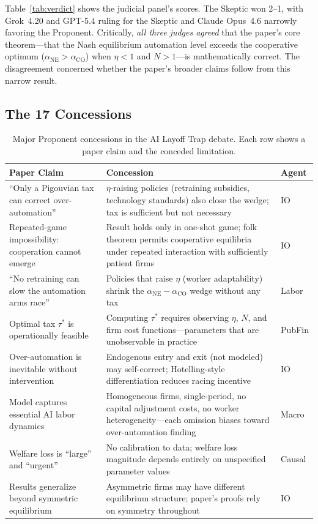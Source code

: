 \documentclass[11pt]{article}
\begin{document}
Table~\ref{tab:verdict} shows the judicial panel's scores.
The Skeptic won 2--1, with Grok~4.20 and GPT-5.4 ruling for the Skeptic and Claude Opus~4.6 narrowly favoring the Proponent.
Critically, \emph{all three judges agreed} that the paper's core theorem---that the Nash equilibrium automation level exceeds the cooperative optimum ($\alpha_{\mathrm{NE}} > \alpha_{\mathrm{CO}}$) when $\eta < 1$ and $N > 1$---is mathematically correct.
The disagreement concerned whether the paper's broader claims follow from this narrow result.


\subsection{The 17 Concessions}

\begin{table}[t]
\centering
\caption{Major Proponent concessions in the AI Layoff Trap debate. Each row shows a paper claim and the conceded limitation.}
\label{tab:concessions}
\small
\begin{tabularx}{\textwidth}{@{}p{3.8cm}Xl@{}}
\toprule
\textbf{Paper Claim} & \textbf{Concession} & \textbf{Agent} \\
\midrule
``Only a Pigouvian tax can correct over-automation'' &
$\eta$-raising policies (retraining subsidies, technology standards) also close the wedge; tax is sufficient but not necessary &
IO \\
\addlinespace
Repeated-game impossibility: cooperation cannot emerge &
Result holds only in one-shot game; folk theorem permits cooperative equilibria under repeated interaction with sufficiently patient firms &
IO \\
\addlinespace
``No retraining can slow the automation arms race'' &
Policies that raise $\eta$ (worker adaptability) shrink the $\alpha_{\mathrm{NE}} - \alpha_{\mathrm{CO}}$ wedge without any tax &
Labor \\
\addlinespace
Optimal tax $\tau^*$ is operationally feasible &
Computing $\tau^*$ requires observing $\eta$, $N$, and firm cost functions---parameters that are unobservable in practice &
PubFin \\
\addlinespace
Over-automation is inevitable without intervention &
Endogenous entry and exit (not modeled) may self-correct; Hotelling-style differentiation reduces racing incentive &
IO \\
\addlinespace
Model captures essential AI labor dynamics &
Homogeneous firms, single-period, no capital adjustment costs, no worker heterogeneity---each omission biases toward over-automation finding &
Macro \\
\addlinespace
Welfare loss is ``large'' and ``urgent'' &
No calibration to data; welfare loss magnitude depends entirely on unspecified parameter values &
Causal \\
\addlinespace
Results generalize beyond symmetric equilibrium &
Asymmetric firms may have different equilibrium structure; paper's proofs rely on symmetry throughout &
IO \\
\bottomrule
\end{tabularx}
\end{table}
\end{document}
